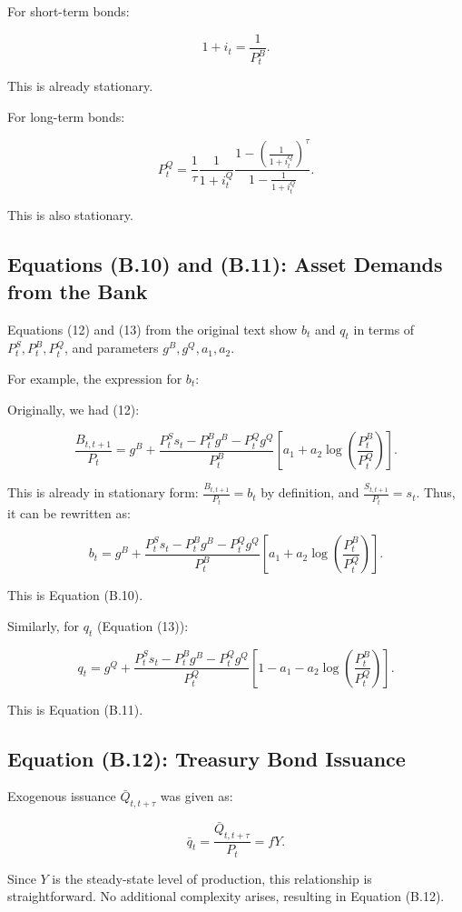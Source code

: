 \documentclass[12pt]{article}
\begin{document}
For short-term bonds:

\[
1+i_t = \frac{1}{P_t^B}.
\]

This is already stationary.

For long-term bonds:

\[
P_t^Q = \frac{1}{\tau} \frac{1}{1+i_t^Q} \frac{1 - \left(\frac{1}{1+i_t^Q}\right)^\tau}{1 - \frac{1}{1+i_t^Q}}.
\]

This is also stationary.


\subsection{Equations (B.10) and (B.11): Asset Demands from the Bank}

Equations (12) and (13) from the original text show \( b_t \) and \( q_t \) in terms of \( P_t^S, P_t^B, P_t^Q \), and parameters \( g^B, g^Q, a_1, a_2 \).

For example, the expression for \( b_t \):

Originally, we had (12):

\[
\frac{B_{t, t+1}}{P_t} = g^B + \frac{P_t^S s_t - P_t^B g^B - P_t^Q g^Q}{P_t^B}\left[a_1 + a_2 \log \left(\frac{P_t^B}{P_t^Q}\right)\right].
\]

This is already in stationary form: \( \frac{B_{t, t+1}}{P_t} = b_t \) by definition, and \( \frac{S_{t, t+1}}{P_t} = s_t \). Thus, it can be rewritten as:

\[
b_t = g^B + \frac{P_t^S s_t - P_t^B g^B - P_t^Q g^Q}{P_t^B}\left[a_1 + a_2 \log \left(\frac{P_t^B}{P_t^Q}\right)\right].
\]

This is Equation (B.10).

Similarly, for \( q_t \) (Equation (13)):

\[
q_t = g^Q + \frac{P_t^S s_t - P_t^B g^B - P_t^Q g^Q}{P_t^Q}\left[1 - a_1 - a_2 \log \left(\frac{P_t^B}{P_t^Q}\right)\right].
\]

This is Equation (B.11).


\subsection{Equation (B.12): Treasury Bond Issuance}

Exogenous issuance \( \bar{Q}_{t, t+\tau} \) was given as:

\[
\bar{q}_t = \frac{\bar{Q}_{t, t+\tau}}{P_t} = f Y.
\]

Since \( Y \) is the steady-state level of production, this relationship is straightforward. No additional complexity arises, resulting in Equation (B.12).
\end{document}
